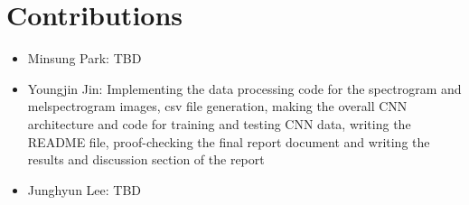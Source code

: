 \documentclass{article}
\theoremstyle{plain}
\theoremstyle{definition}
\theoremstyle{remark}
\begin{document}
\section{Contributions}

\begin{itemize}
\item Minsung Park: TBD

\item Youngjin Jin: Implementing the data processing code for the spectrogram and melspectrogram images, csv file generation, making the overall CNN architecture and code for training and testing CNN data, writing the README file, proof-checking the final report document and writing the results and discussion section of the report

\item Junghyun Lee: TBD

\end{itemize}
\end{document}
